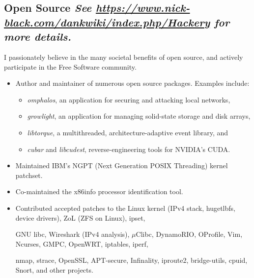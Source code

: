 \documentclass{article}
\newenvironment{tightitemize}
{\begin{itemize}
  \setlength{\itemsep}{1pt}
  \setlength{\parskip}{0pt}
  \setlength{\parsep}{0pt}}
{\end{itemize}}
\begin{document}
\subsection*{Open Source \hfill\tiny\textit{See \href{https://www.nick-black.com/dankwiki/index.php/Hackery}{https://www.nick-black.com/dankwiki/index.php/Hackery} for more details.}}
I passionately believe in the many societal benefits of open source, and actively
participate in the Free Software community.
\begin{tightitemize}
\item Author and maintainer of numerous open source packages. Examples include:
\begin{tightitemize}
\item \textit{omphalos}, an application for securing and attacking local networks,
\item \textit{growlight}, an application for managing solid-state storage and disk arrays,
\item \textit{libtorque}, a multithreaded, architecture-adaptive event library, and
\item \textit{cubar} and \textit{libcudest}, reverse-engineering tools for NVIDIA's CUDA.
\end{tightitemize}
\item Maintained IBM's NGPT (Next Generation POSIX Threading) kernel patchset.
\item Co-maintained the x86info processor identification tool.
\item Contributed accepted patches to
the Linux kernel (IPv4 stack, hugetlbfs, device drivers), ZoL (ZFS on Linux), ipset,

{\indent}GNU libc, Wireshark (IPv4 analysis), $\mu$Clibc, DynamoRIO, OProfile, Vim, Ncurses, GMPC, OpenWRT, iptables,
iperf,

{\indent}nmap, strace, OpenSSL, APT-secure, Infinality, iproute2, bridge-utils, cpuid, Snort, and other projects.
\end{tightitemize}

\vspace{2mm}
\end{document}

